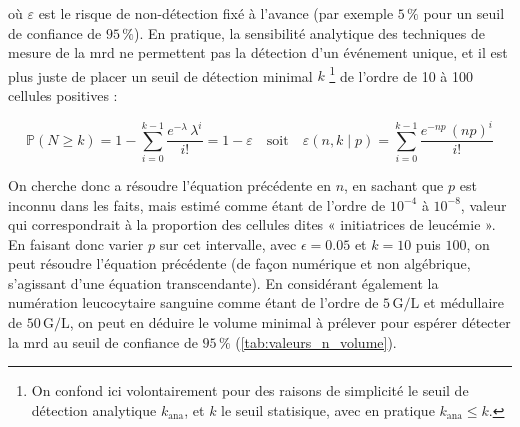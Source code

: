 où $\varepsilon$ est le risque de non-détection fixé à l'avance (par exemple $5\,\%$ pour un seuil de confiance de $95\,\%$).
En pratique, la sensibilité analytique des techniques de mesure de la \gls{mrd} ne permettent pas la détection d'un événement unique, et il est plus juste de placer 
un seuil de détection minimal $k$ \footnote{On confond ici volontairement pour des raisons de simplicité le seuil de détection analytique $k_{\text{ana}}$, 
et $k$ le seuil statisique, avec en pratique $k_{\text{ana}} \leq k$.} de l'ordre de 10 à 100 cellules positives : 

\begin{equation}
    \mathbb{P}(N \geq k) = 1 - \sum_{i = 0}^{k-1} \frac{e^{-\lambda} \, \lambda^{i}}{i!} = 1 - \varepsilon
    \quad \text{soit} \quad \varepsilon(n,k \mid p) = \sum_{i = 0}^{k-1} \frac{e^{-np} \, (np)^{i}}{i!}
\end{equation}

On cherche donc a résoudre l'équation précédente en $n$, en sachant que $p$ est inconnu dans les faits, mais estimé comme étant de l'ordre de $10^{-4}$ à $10^{-8}$, 
valeur qui correspondrait à la proportion des cellules dites « initiatrices de leucémie ». En faisant donc varier $p$ sur cet intervalle, avec $\epsilon = 0.05$ et 
$k = 10$ puis $100$, on peut résoudre l'équation précédente (de façon numérique et non algébrique, s'agissant d'une équation transcendante). En considérant également 
la numération leucocytaire sanguine comme étant de l'ordre de $5\,\text{G/L}$ et médullaire de $50\,\text{G/L}$, on peut en déduire le volume minimal à prélever 
pour espérer détecter la \gls{mrd} au seuil de confiance de $95\,\%$ (\autoref{tab:valeurs_n_volume}).

